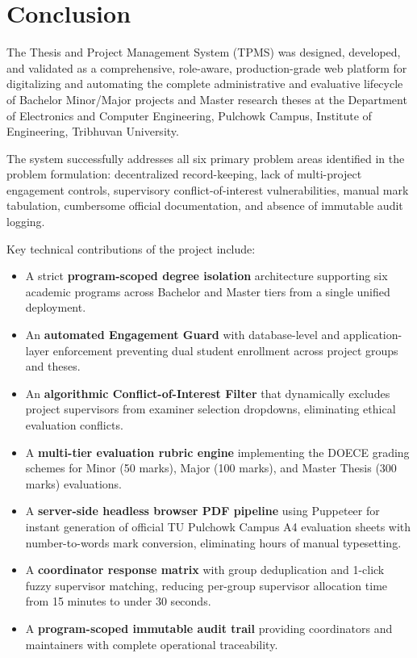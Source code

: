 \chapter{Conclusion}

The Thesis and Project Management System (TPMS) was designed, developed, and validated as a comprehensive, role-aware, production-grade web platform for digitalizing and automating the complete administrative and evaluative lifecycle of Bachelor Minor/Major projects and Master research theses at the Department of Electronics and Computer Engineering, Pulchowk Campus, Institute of Engineering, Tribhuvan University.

The system successfully addresses all six primary problem areas identified in the problem formulation: decentralized record-keeping, lack of multi-project engagement controls, supervisory conflict-of-interest vulnerabilities, manual mark tabulation, cumbersome official documentation, and absence of immutable audit logging.

Key technical contributions of the project include:
\begin{itemize}
    \item A strict \textbf{program-scoped degree isolation} architecture supporting six academic programs across Bachelor and Master tiers from a single unified deployment.
    \item An \textbf{automated Engagement Guard} with database-level and application-layer enforcement preventing dual student enrollment across project groups and theses.
    \item An \textbf{algorithmic Conflict-of-Interest Filter} that dynamically excludes project supervisors from examiner selection dropdowns, eliminating ethical evaluation conflicts.
    \item A \textbf{multi-tier evaluation rubric engine} implementing the DOECE grading schemes for Minor (50 marks), Major (100 marks), and Master Thesis (300 marks) evaluations.
    \item A \textbf{server-side headless browser PDF pipeline} using Puppeteer for instant generation of official TU Pulchowk Campus A4 evaluation sheets with number-to-words mark conversion, eliminating hours of manual typesetting.
    \item A \textbf{coordinator response matrix} with group deduplication and 1-click fuzzy supervisor matching, reducing per-group supervisor allocation time from 15 minutes to under 30 seconds.
    \item A \textbf{program-scoped immutable audit trail} providing coordinators and maintainers with complete operational traceability.
\end{itemize}

